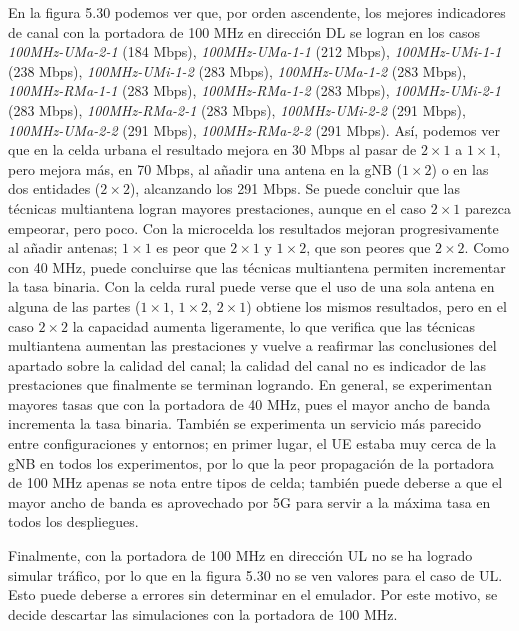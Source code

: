 \documentclass[12pt]{report} %
\begin{document}
En la figura 5.30 podemos ver que,
por orden ascendente, los mejores indicadores de canal con la portadora de 100 MHz en dirección DL se logran en los casos
\textit{100MHz-UMa-2-1} (184 Mbps),
\textit{100MHz-UMa-1-1} (212 Mbps),
\textit{100MHz-UMi-1-1} (238 Mbps),
\textit{100MHz-UMi-1-2} (283 Mbps),
\textit{100MHz-UMa-1-2} (283 Mbps),
\textit{100MHz-RMa-1-1} (283 Mbps),
\textit{100MHz-RMa-1-2} (283 Mbps),
\textit{100MHz-UMi-2-1} (283 Mbps),
\textit{100MHz-RMa-2-1} (283 Mbps),
\textit{100MHz-UMi-2-2} (291 Mbps),
\textit{100MHz-UMa-2-2} (291 Mbps),
\textit{100MHz-RMa-2-2} (291 Mbps).
Así, podemos ver que en la celda urbana el resultado mejora en 30 Mbps al pasar de $2 \times 1$ a $1 \times 1$,
pero mejora más, en 70 Mbps, al añadir una antena en la gNB ($1 \times 2$)
o en las dos entidades ($2 \times 2$), alcanzando los 291 Mbps.
Se puede concluir que las técnicas multiantena logran mayores prestaciones,
aunque en el caso $2 \times 1$ parezca empeorar, pero poco.
Con la microcelda los resultados mejoran progresivamente al añadir antenas;
$1 \times 1$ es peor que $2 \times 1$ y $1 \times 2$, que son peores que $2 \times 2$.
Como con 40 MHz, puede concluirse que las técnicas multiantena permiten incrementar la tasa binaria.
Con la celda rural puede verse que el uso de una sola antena en alguna de las partes ($1 \times 1$, $1 \times 2$, $2 \times 1$) obtiene los mismos resultados,
pero en el caso $2 \times 2$ la capacidad aumenta ligeramente,
lo que verifica que las técnicas multiantena aumentan las prestaciones
y vuelve a reafirmar las conclusiones del apartado sobre la calidad del canal;
la calidad del canal no es indicador de las prestaciones que finalmente se terminan logrando.
En general, se experimentan mayores tasas que con la portadora de 40 MHz, pues el mayor ancho de banda incrementa la tasa binaria.
También se experimenta un servicio más parecido entre configuraciones y entornos;
en primer lugar, el UE estaba muy cerca de la gNB en todos los experimentos, por lo que la peor propagación de la portadora de 100 MHz apenas se nota entre tipos de celda;
también puede deberse a que el mayor ancho de banda es aprovechado por 5G para servir a la máxima tasa en todos los despliegues.

Finalmente, con la portadora de 100 MHz en dirección UL no se ha logrado simular tráfico,
por lo que en la figura 5.30 no se ven valores para el caso de UL.
Esto puede deberse a errores sin determinar en el emulador.
Por este motivo, se decide descartar las simulaciones con la portadora de 100 MHz.
\end{document}
